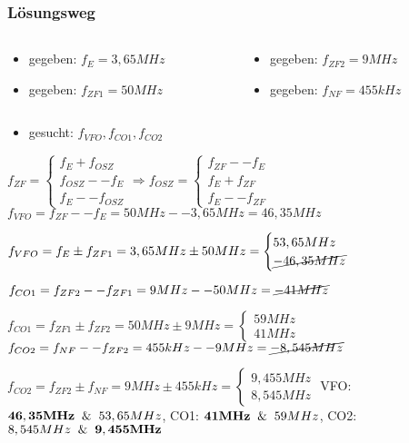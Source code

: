 \begin{frame}
\frametitle{Lösungsweg}
\begin{columns}
    \begin{column}{0.48\textwidth}
    \begin{itemize}
  \item gegeben: $f_{E} = 3,65MHz$
  \item gegeben: $f_{ZF1} = 50MHz$
  \end{itemize}

    \end{column}
   \begin{column}{0.48\textwidth}
       \begin{itemize}
  \item gegeben: $f_{ZF2} = 9MHz$
  \item gegeben: $f_{NF} = 455kHz$
  \end{itemize}

   \end{column}
\end{columns}

\begin{itemize}
  \item gesucht: $f_{VFO}, f_{CO1}, f_{CO2}$
  \end{itemize}
    \pause
    $f_{ZF} = \begin{cases}f_E + f_{OSZ}\\ f_{OSZ} -- f_E\\ f_E -- f_{OSZ}\end{cases} \Rightarrow f_{OSZ} = \begin{cases}f_{ZF} -- f_E\\ f_E + f_{ZF}\\ f_E -- f_{ZF}\end{cases}$
    \pause
    $f_{VFO} = f_{ZF} -- f_E = 50MHz -- 3,65MHz = 46,35MHz$

$f_{VFO} = f_E \pm f_{ZF1} = 3,65MHz \pm 50MHz = \begin{cases}53,65MHz\\ \cancel{-46,35MHz}\end{cases}$



\end{frame}

\begin{frame}
    \pause
    $f_{CO1} = f_{ZF2} -- f_{ZF1} = 9MHz -- 50MHz = \cancel{-41MHz}$

$f_{CO1} = f_{ZF1} \pm f_{ZF2} = 50MHz \pm 9MHz = \begin{cases}59MHz\\ 41MHz\end{cases}$
    \pause
    $f_{CO2} = f_{NF} -- f_{ZF2} = 455kHz -- 9MHz = \cancel{-8,545MHz}$

$f_{CO2} = f_{ZF2} \pm f_{NF} = 9MHz \pm 455kHz = \begin{cases}9,455MHz\\ 8,545MHz\end{cases}$
    \pause
    VFO: $\bold{46,35MHz} \And 53,65MHz$, CO1: $\bold{41MHz} \And 59MHz$, CO2: $8,545MHz \And \bold{9,455MHz}$



\end{frame}


